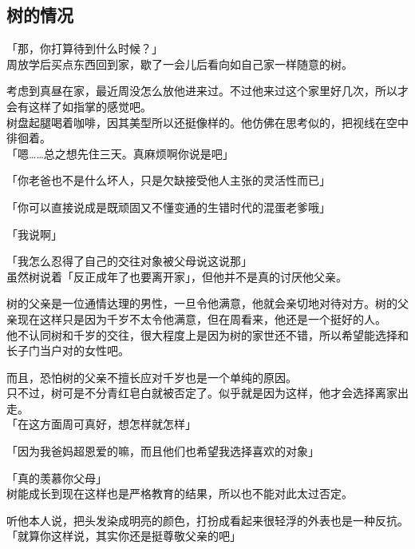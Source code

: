 \subsection{树的情况}

「那，你打算待到什么时候？」\\

周放学后买点东西回到家，歇了一会儿后看向如自己家一样随意的树。

考虑到真昼在家，最近周没怎么放他进来过。不过他来过这个家里好几次，所以才会有这样了如指掌的感觉吧。\\

树盘起腿喝着咖啡，因其美型所以还挺像样的。他仿佛在思考似的，把视线在空中徘徊着。\\

「嗯……总之想先住三天。真麻烦啊你说是吧」

「你老爸也不是什么坏人，只是欠缺接受他人主张的灵活性而已」

「你可以直接说成是既顽固又不懂变通的生错时代的混蛋老爹哦」

「我说啊」

「我怎么忍得了自己的交往对象被父母说这说那」\\

虽然树说着「反正成年了也要离开家」，但他并不是真的讨厌他父亲。

树的父亲是一位通情达理的男性，一旦令他满意，他就会亲切地对待对方。树的父亲现在这样只是因为千岁不太令他满意，但在周看来，他还是一个挺好的人。\\

他不认同树和千岁的交往，很大程度上是因为树的家世还不错，所以希望能选择和长子门当户对的女性吧。

而且，恐怕树的父亲不擅长应对千岁也是一个单纯的原因。\\

只不过，树可是不分青红皂白就被否定了。似乎就是因为这样，他才会选择离家出走。\\

「在这方面周可真好，想怎样就怎样」

「因为我爸妈超恩爱的嘛，而且他们也希望我选择喜欢的对象」

「真的羡慕你父母」\\

树能成长到现在这样也是严格教育的结果，所以也不能对此太过否定。

听他本人说，把头发染成明亮的颜色，打扮成看起来很轻浮的外表也是一种反抗。\\

「就算你这样说，其实你还是挺尊敬父亲的吧」

